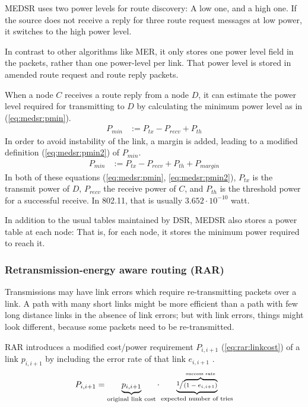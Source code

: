 MEDSR uses two power levels for route discovery: A low one, and a high one. If
the source does not receive a reply for three route request messages at low
power, it switches to the high power level.

In contrast to other algorithms like MER, it only stores one power level field
in the packets, rather than one power-level per link. That power level is stored
in amended route request and route reply packets.

When a node $C$ receives a route reply from a node $D$, it can estimate the
power level required for transmitting to $D$ by calculating the minimum power
level as in (\ref{eq:medsr:pmin}).
\begin{align}
  \label{eq:medsr:pmin}
   P_{min} &:= P_{tx} - P_{recv} + P_{th} 
\end{align}
In order to avoid instability of the link, a margin is added,
leading to a modified definition (\ref{eq:medsr:pmin2}) of $P_{min}$.
\begin{align}
  \label{eq:medsr:pmin2}
   P_{min} &:= P_{tx} - P_{recv} + P_{th} + P_{margin}
\end{align}
In both of these equations (\ref{eq:medsr:pmin}, \ref{eq:medsr:pmin2}), $P_{tx}$ is the transmit power of $D$, $P_{recv}$ the receive power of $C$,
and $P_{th}$ is the threshold power for a successful receive. In 802.11, that is
usually $3.652 \cdot 10^{-10}$ watt.

In addition to the usual tables maintained by DSR, MEDSR also stores a power
table at each node: That is, for each node, it stores the minimum power required to reach it.



\subsubsection{Retransmission-energy aware routing (RAR)}
Transmissions may have link errors which require re-transmitting packets over
a link. A path with many short links might be more efficient than a path with
few long distance links in the absence of link errors; but with link errors,
things might look different, because some packets need to be re-transmitted.

RAR\cite{banerjee2002minimum} introduces a modified cost/power requirement
$P_{i,i+1}$ (\ref{eq:rar:linkcost}) of a link $p_{i,i+1}$ by including the error
rate of that link $e_{i,i+1}$ .
\begin{align}\label{eq:rar:linkcost}
  P_{i,i+1} = \underbrace{p_{i,i+1}}_{\text{original link cost}} \cdot \underbrace{\sfrac{1}{\overbrace{(1-e_{i,i+1})}^{\text{success rate}}}}_{\text{expected number of tries}}
\end{align} 

